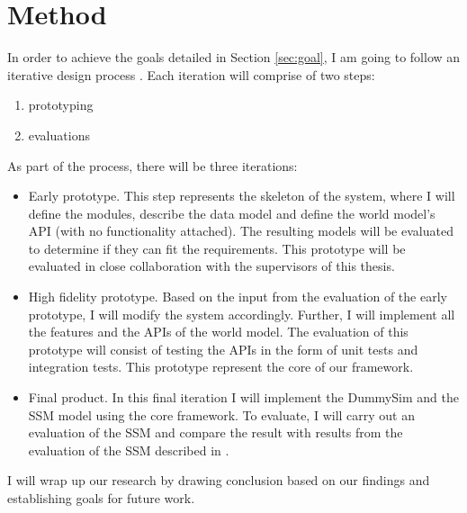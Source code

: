 \section{Method} %
\label{sec:method}

In order to achieve the goals detailed in Section \ref{sec:goal}, I am going to follow an iterative design process \cite{mackay1997hci}. Each iteration will comprise of two steps:
\begin{enumerate}
	\item prototyping
	\item evaluations
\end{enumerate}

As part of the process, there will be three iterations:
\begin{itemize}
	\item Early prototype. This step represents the skeleton of the system, where I will define the modules, describe the data model and define the world model's API (with no functionality attached). The resulting models will be evaluated to determine if they can fit the requirements. This prototype will be evaluated in close collaboration with the supervisors of this thesis.
	\item High fidelity prototype. Based on the input from the evaluation of the early prototype, I will modify the system accordingly. Further, I will implement all the features and the APIs of the world model. The evaluation of this prototype will consist of testing the APIs in the form of unit tests and integration tests. This prototype represent the core of our framework.
	\item Final product. In this final iteration I will implement the DummySim and the SSM model using the core framework. To evaluate, I will carry out an evaluation of the SSM and compare the result with results from the evaluation of the SSM described in \cite{pederson2011situative}.
\end{itemize}

I will wrap up our research by drawing conclusion based on our findings and establishing goals for future work.

